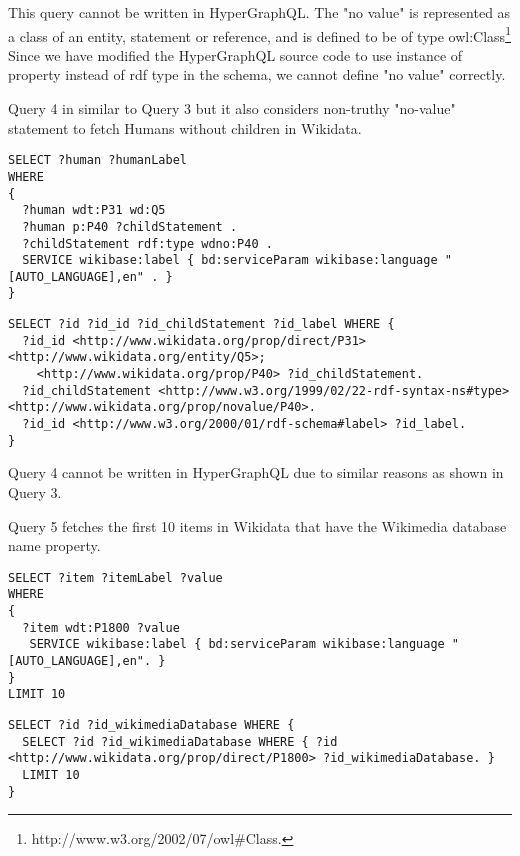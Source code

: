 This query cannot be written in HyperGraphQL. The "no value" is represented as a class of an entity, statement or reference, and is defined to be of type owl:Class\footnote{http://www.w3.org/2002/07/owl\#Class.} Since we have modified the HyperGraphQL source code to use instance of property instead of rdf type in the schema, we cannot define "no value" correctly.


Query 4 in similar to Query 3 but it also considers non-truthy "no-value" statement to fetch Humans without children in Wikidata.

\begin{minipage}{\linewidth}
\begin{lstlisting}[label=listing:listing41, caption={Query 4}]
SELECT ?human ?humanLabel
WHERE
{
  ?human wdt:P31 wd:Q5 
  ?human p:P40 ?childStatement . 
  ?childStatement rdf:type wdno:P40 .
  SERVICE wikibase:label { bd:serviceParam wikibase:language "[AUTO_LANGUAGE],en" . }
}
\end{lstlisting}
\end{minipage}


\begin{minipage}{\linewidth}
\begin{lstlisting}[label=listing:listing42, caption={Query 4 - GraphQL-LD}]
SELECT ?id ?id_id ?id_childStatement ?id_label WHERE {
  ?id_id <http://www.wikidata.org/prop/direct/P31> <http://www.wikidata.org/entity/Q5>;
    <http://www.wikidata.org/prop/P40> ?id_childStatement.
  ?id_childStatement <http://www.w3.org/1999/02/22-rdf-syntax-ns#type> <http://www.wikidata.org/prop/novalue/P40>.
  ?id_id <http://www.w3.org/2000/01/rdf-schema#label> ?id_label.
}
\end{lstlisting}
\end{minipage}

Query 4 cannot be written in HyperGraphQL due to similar reasons as shown in Query 3.


Query 5 fetches the first 10 items in Wikidata that have the Wikimedia database name property.

\begin{minipage}{\linewidth}
\begin{lstlisting}[label=listing:listing43, caption={Query 5}]
SELECT ?item ?itemLabel ?value
WHERE
{
  ?item wdt:P1800 ?value
   SERVICE wikibase:label { bd:serviceParam wikibase:language "[AUTO_LANGUAGE],en". }
}
LIMIT 10
\end{lstlisting}
\end{minipage}

\begin{minipage}{\linewidth}
\begin{lstlisting}[label=listing:listing44, caption={Query 5 - GraphQL-LD}]
SELECT ?id ?id_wikimediaDatabase WHERE {
  SELECT ?id ?id_wikimediaDatabase WHERE { ?id <http://www.wikidata.org/prop/direct/P1800> ?id_wikimediaDatabase. }
  LIMIT 10
}
\end{lstlisting}
\end{minipage}

